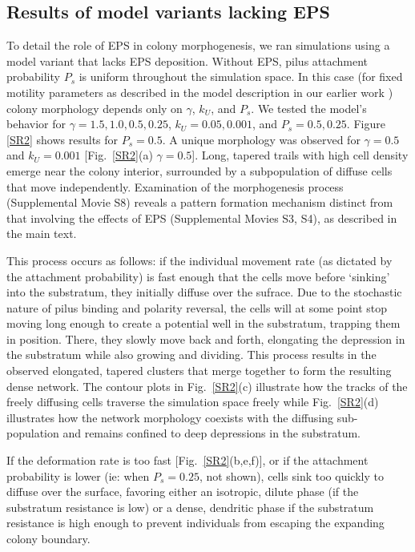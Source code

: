 \documentclass[aps,prl,numerical,reprint,superscriptaddress,showpacs]{revtex4-1}
\begin{document}
\subsection{Results of model variants lacking EPS}

To detail the role of EPS in colony morphogenesis, we ran simulations using a model variant that lacks EPS deposition. Without EPS, pilus attachment probability $P_s$ is uniform throughout the simulation space. In this case (for fixed motility parameters as described in the model description in our earlier work \cite{zachreson2016emergent}) colony morphology depends only on $\gamma$, $k_U$, and $P_s$. We tested the model's behavior for $\gamma = 1.5, 1.0, 0.5, 0.25$, $k_U = 0.05, 0.001$, and $P_s = 0.5, 0.25$. Figure \ref{SR2} shows results for $P_s = 0.5$. A unique morphology was observed for $\gamma = 0.5$ and $k_U = 0.001$ [Fig.~\ref{SR2}(a) $\gamma = 0.5$]. Long, tapered trails with high cell density emerge near the colony interior, surrounded by a subpopulation of diffuse cells that move independently. Examination of the morphogenesis process (Supplemental Movie S8) reveals a pattern formation mechanism distinct from that involving the effects of EPS (Supplemental Movies S3, S4), as described in the main text. 


This process occurs as follows: if the individual movement rate (as dictated by the attachment probability) is fast enough that the cells move before `sinking' into the substratum, they initially diffuse over the sufrace. Due to the stochastic nature of pilus binding and polarity reversal, the cells will at some point stop moving long enough to create a potential well in the substratum, trapping them in position. There, they slowly move back and forth, elongating the depression in the substratum while also growing and dividing. This process results in the observed elongated, tapered clusters that merge together to form the resulting dense network. The contour plots in Fig.~\ref{SR2}(c) illustrate how the tracks of the freely diffusing cells traverse the simulation space freely while Fig.~\ref{SR2}(d) illustrates how the network morphology coexists with the diffusing sub-population and remains confined to deep depressions in the substratum. 

If the deformation rate is too fast [Fig.~\ref{SR2}(b,e,f)], or if the attachment probability is lower (ie: when $P_s = 0.25$, not shown), cells sink too quickly to diffuse over the surface, favoring either an isotropic, dilute phase (if the substratum resistance is low) or a dense, dendritic phase if the substratum resistance is high enough to prevent individuals from escaping the expanding colony boundary.
\end{document}
